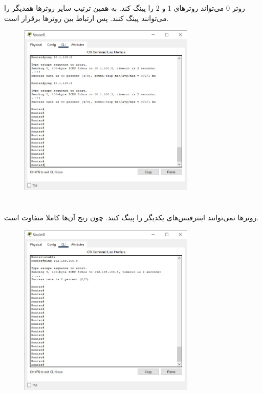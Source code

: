 \documentclass{article}
\begin{document}
\section{}%
\section{}%
روتر 0 می‌تواند روترهای 1 و 2 را پینگ کند. به همین ترتیب سایر روترها همدیگر را می‌توانند پینگ کنند. پس ارتباط بین روترها برقرار است.
\begin{figure}[H]
    \centering
    \includegraphics[width=0.75\textwidth]{figures/5.jpg}
    \caption{}
    \label{fig:fig1}
\end{figure}

\section{}%
روترها نمی‌توانند اینترفیس‌های  یکدیگر را پینگ کنند. چون رنج آن‌ها کاملا متفاوت است.
\begin{figure}[H]
    \centering
    \includegraphics[width=0.75\textwidth]{figures/6.jpg}
    \caption{}
    \label{fig:fig1}
\end{figure}
\end{document}
